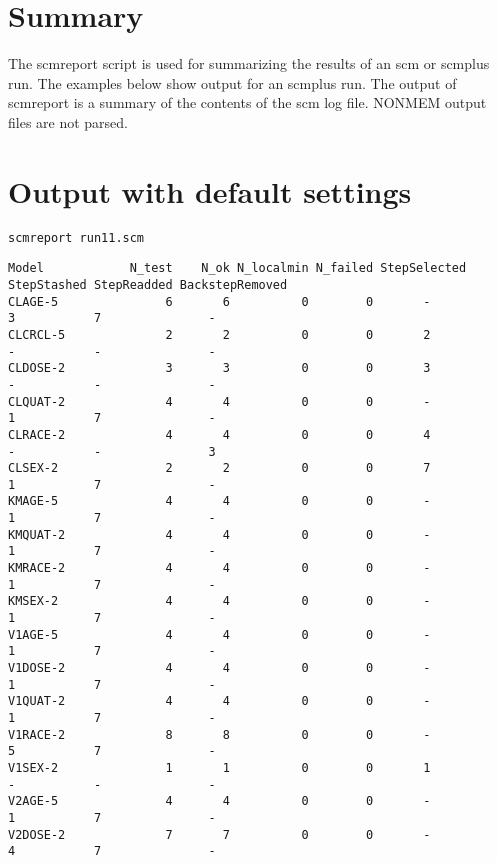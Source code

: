\documentclass[hideglossary,notoc,hidelof,hidelot,hideTheSignaturePage,hideLinkCurrent,hideloa,pdfLatex,noClient,notitle,hideConfidential]{PMXstyle-20190820}
\begin{document}
\section{Summary}
The scmreport script is used for summarizing the results of an scm or scmplus run.
The examples below show output for an scmplus run.
The output of scmreport is a summary of the contents of the scm log file. 
NONMEM output files are not parsed. 

\section{Output with default settings}
\begin{verbatim}
scmreport run11.scm
\end{verbatim}
{\tiny
\begin{verbatim}
Model            N_test    N_ok N_localmin N_failed StepSelected StepStashed StepReadded BackstepRemoved
CLAGE-5               6       6          0        0       -           3           7               -
CLCRCL-5              2       2          0        0       2           -           -               -
CLDOSE-2              3       3          0        0       3           -           -               -
CLQUAT-2              4       4          0        0       -           1           7               -
CLRACE-2              4       4          0        0       4           -           -               3
CLSEX-2               2       2          0        0       7           1           7               -
KMAGE-5               4       4          0        0       -           1           7               -
KMQUAT-2              4       4          0        0       -           1           7               -
KMRACE-2              4       4          0        0       -           1           7               -
KMSEX-2               4       4          0        0       -           1           7               -
V1AGE-5               4       4          0        0       -           1           7               -
V1DOSE-2              4       4          0        0       -           1           7               -
V1QUAT-2              4       4          0        0       -           1           7               -
V1RACE-2              8       8          0        0       -           5           7               -
V1SEX-2               1       1          0        0       1           -           -               -
V2AGE-5               4       4          0        0       -           1           7               -
V2DOSE-2              7       7          0        0       -           4           7               -

\end{verbatim}}
\end{document}
